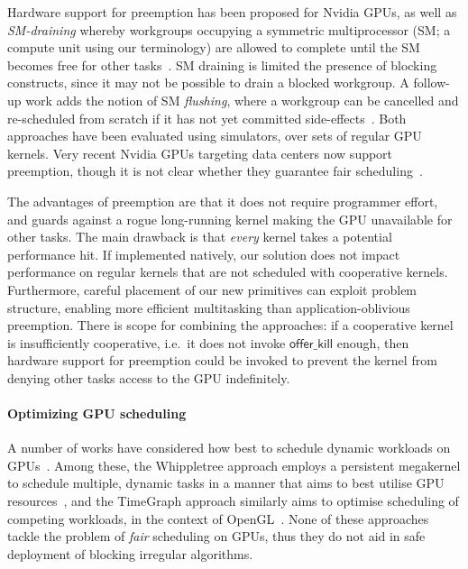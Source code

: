 \documentclass[numbers,nocopyrightspace,10pt]{sigplanconf}
\newcommand{\nvidia}{Nvidia\xspace}
\newcommand{\offerkill}{\mathsf{offer\_kill}}
\begin{document}
Hardware support for preemption has been proposed for \nvidia GPUs,
as well as \emph{SM-draining}
whereby workgroups occupying a symmetric multiprocessor (SM; a compute
unit using our terminology) are allowed to complete until the SM becomes free for
other tasks~\cite{DBLP:conf/isca/TanasicGCRNV14}.  SM draining is limited the presence of blocking constructs, since it may not be possible to drain a blocked workgroup.
%
A follow-up work adds the notion of SM \emph{flushing},
where a workgroup can be cancelled and re-scheduled
from scratch if it has not yet committed side-effects~\cite{DBLP:conf/asplos/ParkPM15}.  Both approaches have been evaluated
using simulators, over sets of regular GPU kernels.  Very recent \nvidia GPUs targeting data centers now support
preemption, though it is not clear whether they guarantee fair scheduling~\cite{PascalWhitepaper}.

The advantages of preemption are that it does not require programmer
effort, and guards against a rogue long-running kernel making the GPU
unavailable for other tasks.  The main drawback is that \emph{every}
kernel takes a potential performance hit.
%
If implemented natively, our solution does not impact performance on regular kernels that are not scheduled with cooperative kernels.
Furthermore, careful placement of
our new primitives can exploit problem structure, enabling more efficient multitasking than
application-oblivious preemption.  There is scope for combining the approaches: if a
cooperative kernel is insufficiently cooperative, i.e.\ it does not
invoke $\offerkill$ enough, then hardware support for preemption could
be invoked to prevent the kernel from denying other tasks access to
the GPU indefinitely.




\paragraph{Optimizing GPU scheduling}
%
A number of works have considered how best to schedule dynamic
workloads on GPUs~\cite{DBLP:journals/tog/SteinbergerKKHKS12,DBLP:conf/ics/WuCLSV15,DBLP:conf/usenix/KatoLRI11,DBLP:journals/tog/SteinbergerKBKDS14,DBLP:journals/rts/ElliottA12,DBLP:conf/sosp/RossbachCSRW11}.  Among these, the Whippletree approach employs a persistent
megakernel to schedule multiple, dynamic tasks in a manner that aims
to best utilise GPU
resources~\cite{DBLP:journals/tog/SteinbergerKBKDS14}, and the TimeGraph
approach similarly aims to optimise scheduling of competing workloads,
in the context of OpenGL~\cite{DBLP:conf/usenix/KatoLRI11}.
None of these approaches tackle
the problem of \emph{fair} scheduling on GPUs, thus they do not aid in safe deployment of blocking irregular algorithms.
\end{document}
